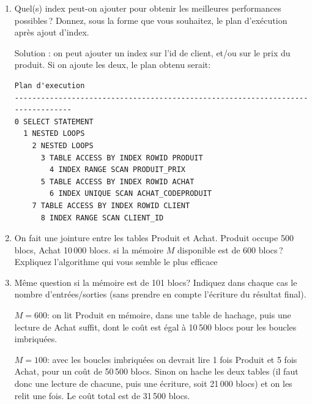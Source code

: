 \begin{enumerate}
\begin{solution}
Il faut matérialiser les tables de hachage, au mieux en mémoire, au
pire sur le disque.
\end{solution}     
  
  \item Quel(s) index  peut-on ajouter pour obtenir les meilleures
      performances possibles\,? Donnez, sous la forme 
      que vous souhaitez, le plan d'exécution
        après ajout d'index.

\begin{solution}
Solution : on peut ajouter un index sur l'id de client, et/ou sur le
prix du produit. Si on ajoute les deux, le  plan obtenu serait:

\begin{verbatim}
Plan d'execution
--------------------------------------------------------------------------------
0 SELECT STATEMENT
  1 NESTED LOOPS
    2 NESTED LOOPS
      3 TABLE ACCESS BY INDEX ROWID PRODUIT
        4 INDEX RANGE SCAN PRODUIT_PRIX
      5 TABLE ACCESS BY INDEX ROWID ACHAT
        6 INDEX UNIQUE SCAN ACHAT_CODEPRODUIT
    7 TABLE ACCESS BY INDEX ROWID CLIENT
      8 INDEX RANGE SCAN CLIENT_ID
\end{verbatim}
\end{solution}

  \item On fait une jointure entre les tables Produit et Achat.
   Produit occupe 500 blocs, Achat 10\,000 blocs. 
    si la mémoire $M$ disponible est de $600$ blocs\,? 
    Expliquez l'algorithme qui vous semble le plus efficace
    
   \item Même question si la mémoire est
        de 101 blocs? Indiquez dans chaque cas le nombre
    d'entrées/sorties (sans prendre en compte l'écriture du résultat final).

     
\begin{solution}
$M=600$: on lit Produit en mémoire, dans une table de hachage,  puis 
 une lecture de Achat suffit,
dont le coût est égal à 10\,500 blocs pour les boucles imbriquées.


$M=100$: avec les boucles imbriquées on devrait lire 1 fois Produit et
5 fois Achat, pour un coût de 50\,500 blocs. Sinon on hache les
deux tables (il faut donc une lecture de chacune, puis 
une écriture, soit 21\,000 blocs) et on les relit une fois. Le
coût total  est de 31\,500 blocs. 
\end{solution}
\end{enumerate}


